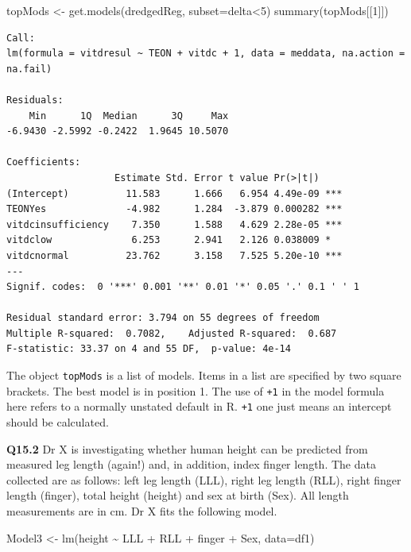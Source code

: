 \documentclass[
  oneside]{krantz}
\newenvironment{Shaded}{\begin{snugshade}}{\end{snugshade}}
\newcommand{\AttributeTok}[1]{\textcolor[rgb]{0.77,0.63,0.00}{#1}}
\newcommand{\DecValTok}[1]{\textcolor[rgb]{0.00,0.00,0.81}{#1}}
\newcommand{\FunctionTok}[1]{\textcolor[rgb]{0.00,0.00,0.00}{#1}}
\newcommand{\NormalTok}[1]{#1}
\newcommand{\OtherTok}[1]{\textcolor[rgb]{0.56,0.35,0.01}{#1}}
\newcommand{\SpecialCharTok}[1]{\textcolor[rgb]{0.00,0.00,0.00}{#1}}
\begin{document}
\begin{Shaded}
\begin{Highlighting}[]
\NormalTok{topMods }\OtherTok{\textless{}{-}} \FunctionTok{get.models}\NormalTok{(dredgedReg, }\AttributeTok{subset=}\NormalTok{delta}\SpecialCharTok{\textless{}}\DecValTok{5}\NormalTok{)}
\FunctionTok{summary}\NormalTok{(topMods[[}\DecValTok{1}\NormalTok{]])}
\end{Highlighting}
\end{Shaded}

\begin{verbatim}
Call:
lm(formula = vitdresul ~ TEON + vitdc + 1, data = meddata, na.action = na.fail)

Residuals:
    Min      1Q  Median      3Q     Max 
-6.9430 -2.5992 -0.2422  1.9645 10.5070 

Coefficients:
                   Estimate Std. Error t value Pr(>|t|)    
(Intercept)          11.583      1.666   6.954 4.49e-09 ***
TEONYes              -4.982      1.284  -3.879 0.000282 ***
vitdcinsufficiency    7.350      1.588   4.629 2.28e-05 ***
vitdclow              6.253      2.941   2.126 0.038009 *  
vitdcnormal          23.762      3.158   7.525 5.20e-10 ***
---
Signif. codes:  0 '***' 0.001 '**' 0.01 '*' 0.05 '.' 0.1 ' ' 1

Residual standard error: 3.794 on 55 degrees of freedom
Multiple R-squared:  0.7082,    Adjusted R-squared:  0.687 
F-statistic: 33.37 on 4 and 55 DF,  p-value: 4e-14
\end{verbatim}

The object \texttt{topMods} is a list of models. Items in a list are specified by two square brackets. The best model is in position 1.
The use of \texttt{+1} in the model formula here refers to a normally unstated default in R. \texttt{+1} one just means an intercept should be calculated.

\textbf{Q15.2} Dr X is investigating whether human height can be predicted from measured leg length (again!) and, in addition, index finger length. The data collected are as follows: left leg length (LLL), right leg length (RLL), right finger length (finger), total height (height) and sex at birth (Sex). All length measurements are in cm. Dr X fits the following model.

\begin{Shaded}
\begin{Highlighting}[]
\NormalTok{Model3 }\OtherTok{\textless{}{-}} \FunctionTok{lm}\NormalTok{(height }\SpecialCharTok{\textasciitilde{}}\NormalTok{ LLL }\SpecialCharTok{+}\NormalTok{ RLL }\SpecialCharTok{+}\NormalTok{ finger }\SpecialCharTok{+}\NormalTok{ Sex, }\AttributeTok{data=}\NormalTok{df1)}
\end{Highlighting}
\end{Shaded}
\end{document}
